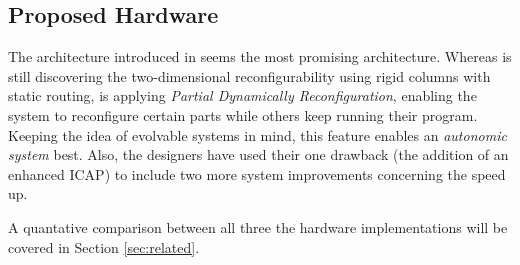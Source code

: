 
\subsection{Proposed Hardware}
\label{sec:hardware}

The architecture introduced in \cite{PDR} seems the most promising architecture. Whereas \cite{virtex4} is still discovering the two-dimensional reconfigurability using rigid columns with static routing, \cite{PDR} is applying \emph{Partial Dynamically Reconfiguration}, enabling the system to reconfigure certain parts while others keep running their program. Keeping the idea of evolvable systems in mind, this feature enables an \emph{autonomic system} best. Also, the designers have used their one drawback (the addition of an enhanced ICAP) to include two more system improvements concerning the speed up. 

A quantative comparison between all three the hardware implementations will be covered in Section \ref{sec:related}.
